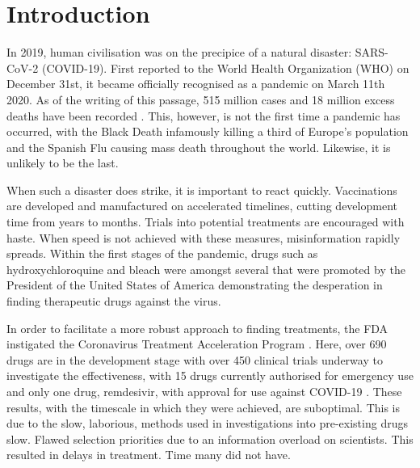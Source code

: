 
\chapter{Introduction}  %

\ifpdf
    \graphicspath{{Chapter1/Figs/Raster/}{Chapter1/Figs/PDF/}{Chapter1/Figs/}}
\else
    \graphicspath{{Chapter1/Figs/Vector/}{Chapter1/Figs/}}
\fi

In 2019, human civilisation was on the precipice of a natural disaster: \mbox{SARS-CoV-2} (\mbox{COVID-19}). First reported to the World Health Organization (WHO) on December 31st, it became officially recognised as a pandemic on March 11th 2020. As of the writing of this passage, 515 million cases and 18 million excess deaths have been recorded \cite{Wan22,WHO22}. This, however, is not the first time a pandemic has occurred, with the Black Death infamously killing a third of Europe's population and the Spanish Flu causing mass death throughout the world. Likewise, it is unlikely to be the last.

When such a disaster does strike, it is important to react quickly. Vaccinations are developed and manufactured on accelerated timelines, cutting development time from years to months. Trials into potential treatments are encouraged with haste. When speed is not achieved with these measures, misinformation rapidly spreads. Within the first stages of the pandemic, drugs such as hydroxychloroquine and bleach were amongst several that were promoted by the President of the United States of America demonstrating the desperation in finding therapeutic drugs against the virus.

In order to facilitate a more robust approach to finding treatments, the FDA instigated the Coronavirus Treatment Acceleration Program \cite{CTAP22}. Here, over 690 drugs are in the development stage with over 450 clinical trials underway to investigate the effectiveness, with 15 drugs currently authorised for emergency use and only one drug, remdesivir, with approval for use against \mbox{COVID-19} \cite{CTAP22}. These results, with the timescale in which they were achieved, are suboptimal. This is due to the slow, laborious, methods used in investigations into pre-existing drugs slow. Flawed selection priorities due to an information overload on scientists. This resulted in delays in treatment. Time many did not have.

